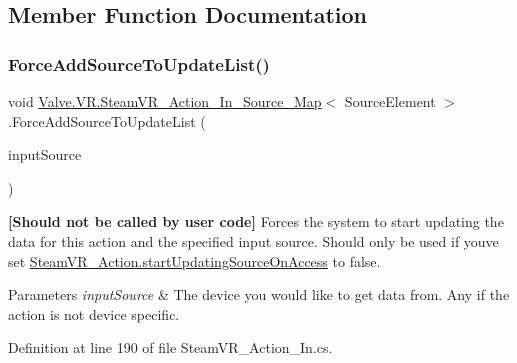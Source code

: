 \subsection{Member Function Documentation}
\mbox{\label{class_valve_1_1_v_r_1_1_steam_v_r___action___in___source___map_aac97f8b8dacc8bb475ce3d055df94b9a}} 
\subsubsection{\texorpdfstring{ForceAddSourceToUpdateList()}{ForceAddSourceToUpdateList()}}
{\footnotesize\ttfamily void \mbox{\hyperlink{class_valve_1_1_v_r_1_1_steam_v_r___action___in___source___map}{Valve.\+V\+R.\+Steam\+V\+R\+\_\+\+Action\+\_\+\+In\+\_\+\+Source\+\_\+\+Map}}$<$ Source\+Element $>$.Force\+Add\+Source\+To\+Update\+List (\begin{DoxyParamCaption}\item[{\mbox{\hyperlink{namespace_valve_1_1_v_r_a82e5bf501cc3aa155444ee3f0662853f}{Steam\+V\+R\+\_\+\+Input\+\_\+\+Sources}}}]{input\+Source }\end{DoxyParamCaption})}



{\bfseries{\mbox{[}Should not be called by user code\mbox{]}}} Forces the system to start updating the data for this action and the specified input source. Should only be used if you\textquotesingle{}ve set \mbox{\hyperlink{class_valve_1_1_v_r_1_1_steam_v_r___action_ae27e9858dec18a4307cca7779ed87ad8}{Steam\+V\+R\+\_\+\+Action.\+start\+Updating\+Source\+On\+Access}} to false. 


\begin{DoxyParams}{Parameters}
{\em input\+Source} & The device you would like to get data from. Any if the action is not device specific.\\
\hline
\end{DoxyParams}


Definition at line 190 of file Steam\+V\+R\+\_\+\+Action\+\_\+\+In.\+cs.

\mbox{\label{class_valve_1_1_v_r_1_1_steam_v_r___action___in___source___map_a4a43cc63a6c174a32dc8e55fd322c4c3}} 
